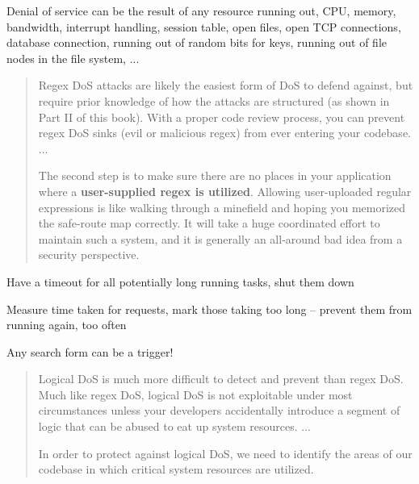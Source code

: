 \documentclass[Screen16to9,17pt]{foils}
\begin{document}
\begin{list2}
\item Denial of service can be the result of any resource running out, CPU, memory, bandwidth, interrupt handling, session table, open files, open TCP connections, database connection, running out of random bits for keys, running out of file nodes in the file system, ...
\end{list2}




\begin{quote}
Regex DoS attacks are likely the easiest form of DoS to defend against, but require prior knowledge of how the attacks are structured (as shown in Part II of this book). With a proper code review process, you can prevent regex DoS sinks (evil or malicious regex) from ever entering your codebase.
...

The second step is to make sure there are no places in your application where a {\bf user-supplied regex is utilized}. Allowing user-uploaded regular expressions is like walking through a minefield and hoping you memorized the safe-route map correctly. It will take a huge coordinated effort to maintain such a system, and it is generally an all-around bad idea from a security perspective.
\end{quote}

\begin{list2}
\item Have a timeout for all potentially long running tasks, shut them down
\item Measure time taken for requests, mark those taking too long -- prevent them from running again, too often
\item Any search form can be a trigger!
\end{list2}




\begin{quote}
Logical DoS is much more difficult to detect and prevent than regex DoS. Much like regex DoS, logical DoS is not exploitable under most circumstances unless your developers accidentally introduce a segment of logic that can be abused to eat up system resources.
...

In order to protect against logical DoS, we need to identify the areas of our codebase in which critical system resources are utilized.
\end{quote}
\end{document}

